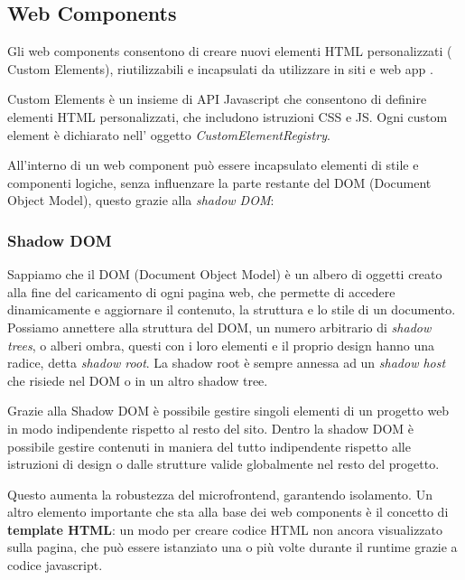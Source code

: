 \subsection{Web Components}
Gli web components consentono di creare nuovi elementi HTML personalizzati ( Custom Elements), riutilizzabili e incapsulati
da utilizzare in siti e web app \cite{webcomponents}.

Custom Elements è un insieme di API Javascript che consentono di definire elementi HTML personalizzati, che includono istruzioni CSS e JS.
Ogni custom element è dichiarato nell' oggetto \emph{CustomElementRegistry}.
\linebreak

All'interno di un web component può essere incapsulato elementi di stile e componenti logiche, senza influenzare
la parte restante del DOM (Document Object Model), questo grazie alla \emph{shadow DOM}:
\subsubsection{Shadow DOM}
Sappiamo che il DOM (Document Object Model) è un albero di oggetti creato alla fine del caricamento di ogni pagina web, che 
permette di accedere dinamicamente e aggiornare il contenuto, la struttura e lo stile di un documento.\cite{dom}
Possiamo annettere alla struttura del DOM, un numero arbitrario di \emph{shadow trees}, 
o alberi ombra, questi con i loro elementi e il proprio design hanno una radice, detta  \emph{shadow root}.
La shadow root è sempre annessa ad un \emph{shadow host} che risiede nel DOM o in un altro shadow tree.

Grazie alla Shadow DOM è possibile gestire singoli elementi di un progetto web in modo indipendente rispetto al resto del sito.
Dentro la shadow DOM è possibile gestire contenuti in maniera del tutto indipendente rispetto alle istruzioni di design o dalle strutture
valide globalmente nel resto del progetto.

Questo aumenta la robustezza del microfrontend, garantendo isolamento.
\linebreak
\linebreak
Un altro elemento importante che sta alla base dei web components è il concetto di \textbf{template HTML}: 
un modo per creare codice HTML non ancora visualizzato sulla pagina, che può essere istanziato una o più volte 
durante il runtime grazie a codice javascript.



